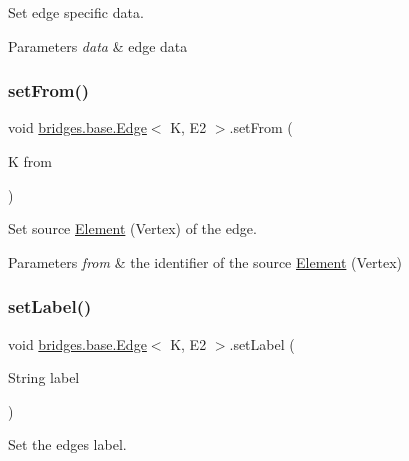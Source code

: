 Set edge specific data.


\begin{DoxyParams}{Parameters}
{\em data} & edge data \\
\hline
\end{DoxyParams}
\mbox{\label{classbridges_1_1base_1_1_edge_aef1a55d996fc36217629b884435b9f35}} 
\subsubsection{\texorpdfstring{set\+From()}{setFrom()}}
{\footnotesize\ttfamily void \mbox{\hyperlink{classbridges_1_1base_1_1_edge}{bridges.\+base.\+Edge}}$<$ K, E2 $>$.set\+From (\begin{DoxyParamCaption}\item[{K}]{from }\end{DoxyParamCaption})}



Set source \mbox{\hyperlink{classbridges_1_1base_1_1_element}{Element}} (Vertex) of the edge. 


\begin{DoxyParams}{Parameters}
{\em from} & the identifier of the source \mbox{\hyperlink{classbridges_1_1base_1_1_element}{Element}} (Vertex) \\
\hline
\end{DoxyParams}
\mbox{\label{classbridges_1_1base_1_1_edge_ad5f1d55a3c8caeb975f497dfe4f29242}} 
\subsubsection{\texorpdfstring{set\+Label()}{setLabel()}}
{\footnotesize\ttfamily void \mbox{\hyperlink{classbridges_1_1base_1_1_edge}{bridges.\+base.\+Edge}}$<$ K, E2 $>$.set\+Label (\begin{DoxyParamCaption}\item[{String}]{label }\end{DoxyParamCaption})}



Set the edge\textquotesingle{}s label. 


